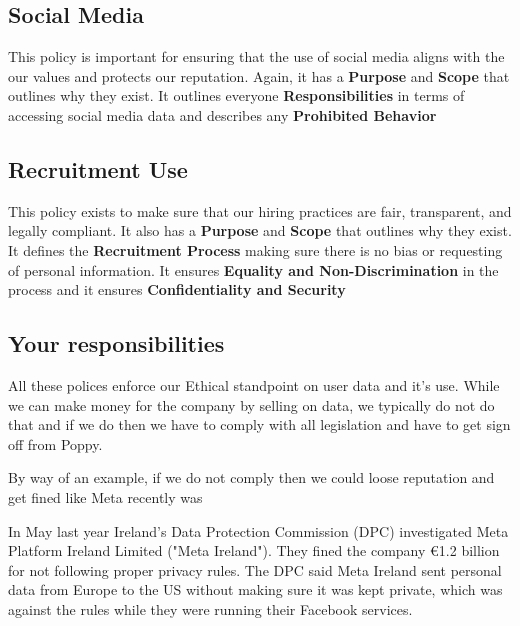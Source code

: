 \documentclass{article}
\begin{document}
\subsection{Social Media}
This policy is important for ensuring that the use of social media aligns with the our values and protects our reputation.
Again, it has a \textbf{Purpose} and \textbf{Scope} that outlines why they exist.
It outlines everyone \textbf{Responsibilities} in terms of accessing social media data and describes any \textbf{Prohibited Behavior}

\subsection{Recruitment Use}
This policy exists to make sure that our hiring practices are fair, transparent, and legally compliant.
It also has a \textbf{Purpose} and \textbf{Scope} that outlines why they exist.
It defines the \textbf{Recruitment Process} making sure there is no bias or requesting of personal information.
It ensures \textbf{Equality and Non-Discrimination} in the process and it ensures \textbf{Confidentiality and Security}
 

\subsection{Your responsibilities}
All these polices enforce our Ethical standpoint on user data and it's use. While we can make money for the company by selling on data, we typically do not do that and if we do then we have to comply with all legislation and have to get sign off from Poppy.

By way of an example, if we do not comply then we could loose reputation and get fined like Meta recently was

In May last year Ireland's Data Protection Commission (DPC) investigated Meta Platform Ireland Limited ("Meta Ireland"). They fined the company €1.2 billion for not following proper privacy rules. The DPC said Meta Ireland sent personal data from Europe to the US without making sure it was kept private, which was against the rules while they were running their Facebook services. \cite{Meta}

\end{document}
